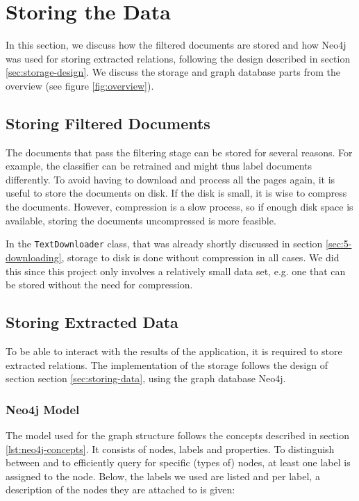 \section{Storing the Data}\label{sec: 5-storing}
In this section, we discuss how the filtered documents are stored and how Neo4j was used for storing extracted relations, following the design described in section \ref{sec:storage-design}. We discuss the storage and graph database parts from the overview (see figure \ref{fig:overview}).

\subsection{Storing Filtered Documents}
The documents that pass the filtering stage can be stored for several reasons. For example, the classifier can be retrained and might thus label documents differently. To avoid having to download and process all the pages again, it is useful to store the documents on disk. If the disk is small, it is wise to compress the documents. However, compression is a slow process, so if enough disk space is available, storing the documents uncompressed is more feasible.

In the \texttt{TextDownloader} class, that was already shortly discussed in section \ref{sec:5-downloading}, storage to disk is done without compression in all cases. We did this since this project only involves a relatively small data set, e.g. one that can be stored without the need for compression.

\subsection{Storing Extracted Data}
To be able to interact with the results of the application, it is required to store extracted relations. The implementation of the storage follows the design of section section \ref{sec:storing-data}, using the graph database Neo4j.

\subsubsection{Neo4j Model}
The model used for the graph structure follows the concepts described in section \ref{lst:neo4j-concepts}. It consists of nodes, labels and properties. To distinguish between and to efficiently query for specific (types of) nodes, at least one label is assigned to the node. Below, the labels we used are listed and per label, a description of the nodes they are attached to is given:

